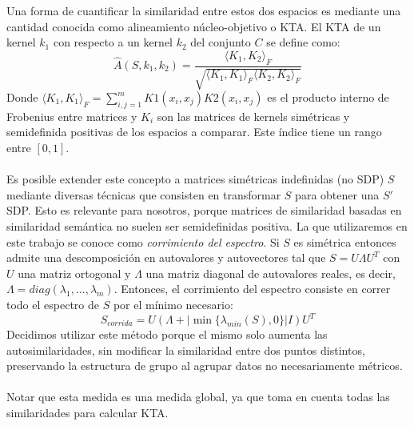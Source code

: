 Una forma de cuantificar la similaridad entre estos dos espacios es mediante una cantidad conocida como alineamiento núcleo-objetivo o KTA. El KTA de un kernel $k_1$ con respecto a un kernel $k_2$ del conjunto $C$ se define como:
\begin{equation}
	\hat{A}(S, k_1, k_2) = \frac{\langle K_1, K_2 \rangle _F}{\sqrt{\langle K_1, K_1 \rangle _F \langle K_2, K_2 \rangle _F}}
\end{equation}
Donde $\langle K_1, K_1 \rangle _F = \sum_{i,j=1}^m K1(x_i, x_j)K2(x_i, x_j)$ es el producto interno de Frobenius entre matrices y $K_i$ son las matrices de kernels simétricas y semidefinida positivas de los espacios a comparar. Este índice tiene un rango entre $[0, 1]$.\cite{Cristianini2006}\\\\
Es posible extender este concepto a matrices simétricas indefinidas (no SDP) $S$ mediante diversas técnicas que consisten en transformar $S$ para obtener una $S'$ SDP. Esto es relevante para nosotros, porque matrices de similaridad basadas en similaridad semántica no suelen ser semidefinidas positiva. La que utilizaremos en este trabajo se conoce como \textit{corrimiento del espectro}. Si $S$ es simétrica entonces admite una descomposición en autovalores y autovectores tal que $S=U\Lambda U^T$ con $U$ una matriz ortogonal y $\Lambda$ una matriz diagonal de autovalores reales, es decir, $\Lambda = diag(\lambda _1,...,\lambda _m)$. Entonces, el corrimiento del espectro consiste en correr todo el espectro de $S$ por el mínimo necesario: 
\begin{equation}
	S_{corrida} = U(\Lambda + |\min\{\lambda _{min}(S), 0\}|I)U^T 
	\label{eq:matriz_corrida}
\end{equation}
Decidimos utilizar este método porque el mismo solo aumenta las autosimilaridades, sin modificar la similaridad entre dos puntos distintos, preservando la estructura de grupo al agrupar datos no necesariamente métricos.\cite{Chen22009}\\\\
Notar que esta medida es una medida global, ya que toma en cuenta todas las similaridades para calcular KTA.\\\\
